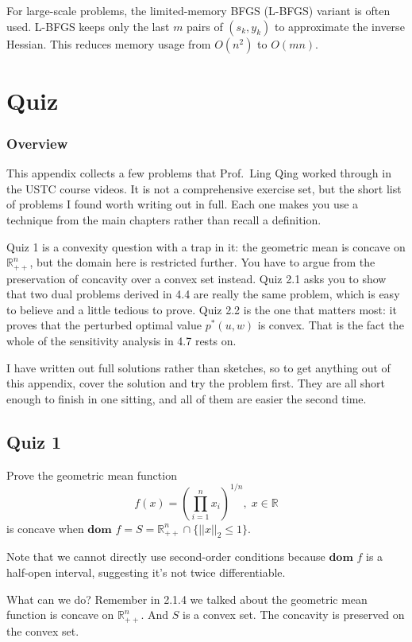 \documentclass[lang=en,color=blue,mode=fancy,titlestyle=hang]{elegantbook}
\begin{document}
For large-scale problems, the limited-memory BFGS (L-BFGS) variant is often used. L-BFGS keeps only
the last $m$ pairs of $(s_k, y_k)$ to approximate the inverse Hessian. This reduces memory usage
from $O(n^2)$ to $O(mn)$.


\newpage
\appendix
\chapter{Quiz}

\subsection*{Overview}

This appendix collects a few problems that Prof.\ Ling Qing worked through in the USTC
course videos. It is not a comprehensive exercise set, but the short list of problems I
found worth writing out in full. Each one makes you use a technique from the main chapters
rather than recall a definition.

Quiz 1 is a convexity question with a trap in it: the geometric mean is concave on
$\mathbb{R}^n_{++}$, but the domain here is restricted further. You have to argue from the
preservation of concavity over a convex set instead. Quiz 2.1 asks you to show that two
dual problems derived in 4.4 are really the same problem, which is easy to believe and a
little tedious to prove. Quiz 2.2 is the one that matters most: it proves that the
perturbed optimal value $p^*(u, w)$ is convex. That is the fact the whole of the
sensitivity analysis in 4.7 rests on.

I have written out full solutions rather than sketches, so to get anything out of this
appendix, cover the solution and try the problem first. They are all short enough to finish
in one sitting, and all of them are easier the second time.

\section{Quiz 1}
Prove the geometric mean function
\[
f(x) = (\prod_{i = 1}^n x_i)^{1/n}, \; x \in \mathbb{R}
\]
is concave when $\textbf{dom } f = S = \mathbb{R}^n_{++} \cap \{ ||x||_2 \leq 1 \}$.

Note that we cannot directly use second-order conditions because $\textbf{dom } f$ is a
half-open interval, suggesting it's not twice differentiable.

What can we do? Remember in 2.1.4 we talked about the geometric mean function is concave
on $\mathbb{R}^n_{++}$. And $S$ is a convex set. The concavity is preserved on the convex
set.
\end{document}
